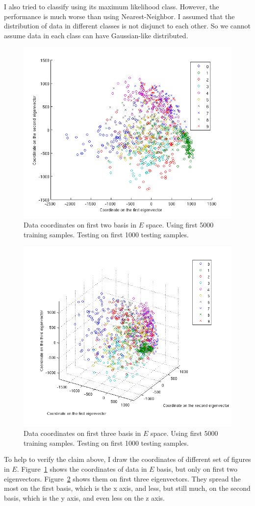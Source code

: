 \documentclass[10pt]{article}
\begin{document}
I also tried to classify using its maximum likelihood class. However,
the performance is much worse than using Nearest-Neighbor. I assumed
that the distribution of data in different classes is not disjunct to
each other. So we cannot assume data in each class can have
Gaussian-like distributed.

\begin{figure}
\centering
\includegraphics[width=0.5\columnwidth]{twod_digit.png}
\caption{Data coordinates on first two basis in $E$ space.  Using
first 5000 training samples. Testing on first 1000 testing samples.}
\label{fig:twod}
\end{figure}

\begin{figure}
\centering
\includegraphics[width=0.5\columnwidth]{threed_digit.png}
\caption{Data coordinates on first three basis in $E$ space.  Using
first 5000 training samples. Testing on first 1000 testing samples.}
\label{fig:threed}
\end{figure}

To help to verify the claim above, I draw the coordinates of different
set of figures in $E$. Figure~\ref{fig:twod} shows the coordinates of
data in $E$ basis, but only on first two eigenvectors.
Figure~\ref{fig:threed} shows them on first three eigenvectors. They
spread the most on the first basis, which is the x axis, and less, but
still much, on the second basis, which is the y axis, and even less on
the z axis.
\end{document}
